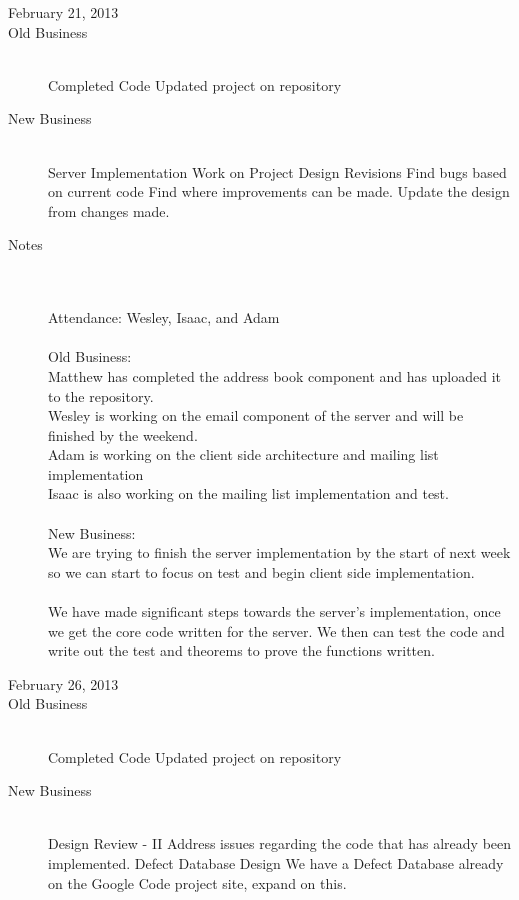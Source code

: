 \documentclass[11pt, letterpaper]{report}
\begin{document}
\begin{description}
\newpage
\item[\Large February 21, 2013]
\hypertarget{February 21, 2013} {}
\item[Old Business] \hfill \\
\subitem Completed Code
\subitem Updated project on repository
\item[New Business] \hfill \\
\subitem Server Implementation
\subitem Work on Project Design Revisions
\subsubitem Find bugs based on current code
\subsubitem Find where improvements can be made.
\subsubitem Update the design from changes made.


\item[Notes] \hfill \\ \hfill \\
Attendance:  Wesley, Isaac, and Adam\\ \\
Old Business: \\
Matthew has completed the address book component and has uploaded it to the repository. \\
Wesley is working on the email component of the server and will be finished by the weekend.\\
Adam is working on the client side architecture and mailing list implementation\\
Isaac is also working on the mailing list implementation and test. 
\\ \\
New Business: \\
We are trying to finish the server implementation by the start of next week so we can start to focus on test and begin client side implementation. \\ \\
We have made significant steps towards the server's implementation, once we get the core code written for the server. We then can test the code and write out the test and theorems to prove the functions written. 


\newpage
\item[\Large February 26, 2013]
\hypertarget{February 26, 2013} {}
\item[Old Business] \hfill \\
\subitem Completed Code
\subitem Updated project on repository
\item[New Business] \hfill \\
\subitem Design Review - II
\subsubitem Address issues regarding the code that has already been implemented.
\subitem Defect Database Design
\subsubitem We have a Defect Database already on the Google Code project site, expand on this.



\end{description}
\end{document}
